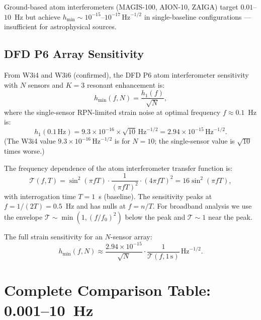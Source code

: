 \documentclass[11pt]{article}
\theoremstyle{definition}
\theoremstyle{remark}
\newcommand{\ee}[1]{\times10^{#1}}
\newcommand{\sqrtHz}{\,\mathrm{Hz}^{-1/2}}
\begin{document}
Ground-based atom interferometers (MAGIS-100, AION-10, ZAIGA) target
$0.01$--$10$~Hz but achieve $h_{\min} \sim 10^{-15}$--$10^{-17}\sqrtHz$
in single-baseline configurations --- insufficient for astrophysical sources.

\subsection{DFD P6 Array Sensitivity}

From W3i4 and W3i6 (confirmed), the DFD P6 atom interferometer sensitivity
with $N$ sensors and $K = 3$ resonant enhancement is:
\begin{equation}
h_{\min}(f, N) = \frac{h_1(f)}{\sqrt{N}},
\label{eq:P6-scaling}
\end{equation}
where the single-sensor RPN-limited strain noise at optimal frequency
$f \approx 0.1$~Hz is:
\begin{equation}
h_1(0.1\,\mathrm{Hz}) = 9.3\ee{-16} \times \sqrt{10}\sqrtHz
= 2.94\ee{-15}\sqrtHz.
\label{eq:h1-single}
\end{equation}
(The W3i4 value $9.3\ee{-16}\sqrtHz$ is for $N = 10$; the single-sensor
value is $\sqrt{10}$ times worse.)

The frequency dependence of the atom interferometer transfer function is:
\begin{equation}
\mathcal{T}(f, T) = \sin^2(\pi f T) \cdot \frac{1}{(\pi f T)^2}
\cdot (4\pi f T)^2 = 16\sin^2(\pi f T),
\label{eq:transfer}
\end{equation}
with interrogation time $T = 1$~s (baseline). The sensitivity peaks at
$f = 1/(2T) = 0.5$~Hz and has nulls at $f = n/T$. For broadband analysis
we use the envelope $\mathcal{T} \sim \min(1, (f/f_0)^2)$ below the peak
and $\mathcal{T} \sim 1$ near the peak.

The full strain sensitivity for an $N$-sensor array:
\begin{equation}
h_{\min}(f, N) \approx \frac{2.94\ee{-15}}{\sqrt{N}}
\cdot \frac{1}{\mathcal{T}(f, 1\,\mathrm{s})}\sqrtHz.
\label{eq:P6-full}
\end{equation}

\section{Complete Comparison Table: 0.001--10~Hz}
\label{sec:P6-comparison}
\end{document}
